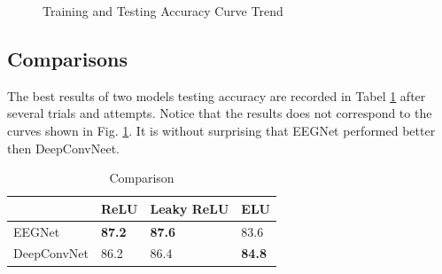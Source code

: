 \documentclass[12pt,a4paper]{article}
\begin{document}
\begin{figure}[hbt]
\centering
{}
\caption{Training and Testing Accuracy Curve Trend}
\label{fig:acc_com}
\end{figure}
\subsection{Comparisons}
The best results of two models testing accuracy are recorded in Tabel \ref{tab:highest} after several trials and attempts. Notice that the results does not correspond to the curves shown in Fig. \ref{fig:acc_com}. It is without surprising that EEGNet performed better then DeepConvNeet. 
\begin{table}[hbt]
\centering
\begin{tabular}{|l|l|l|l|}
\hline
            & ReLU          & Leaky ReLU    & ELU           \\ \hline
EEGNet      & \textbf{87.2} & \textbf{87.6} & 83.6          \\ \hline
DeepConvNet & 86.2          & 86.4          & \textbf{84.8} \\ \hline
\end{tabular}
\caption{Comparison}
\label{tab:highest}
\end{table}
\end{document}

